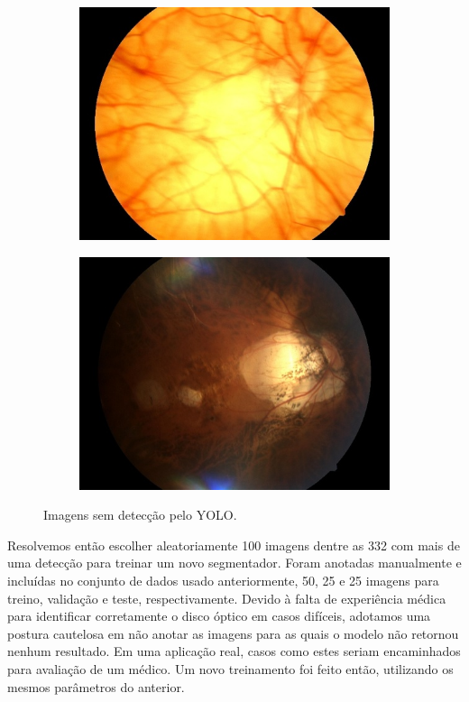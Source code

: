 \documentclass[12pt]{article}
\begin{document}
\begin{figure}
\begin{subfigure}[b]{0.47\textwidth}
        \includegraphics[width=\textwidth]{images/no_box/TRAIN046833_boxes.jpg}
        \label{fig:images_no_box_3}
    \end{subfigure}
    \hfill
    \begin{subfigure}[b]{0.47\textwidth}
        \centering
        \includegraphics[width=\textwidth]{images/no_box/TRAIN099284_boxes.jpg}
        \label{fig:images_no_box_4}
    \end{subfigure}
    \caption{Imagens sem detecção pelo YOLO.}
    \label{fig:images_no_box}
\end{figure}

Resolvemos então escolher aleatoriamente 100 imagens dentre as 332 com mais de uma detecção para treinar um novo segmentador. Foram anotadas manualmente e incluídas no conjunto de dados usado anteriormente, 50, 25 e 25 imagens para treino, validação e teste, respectivamente. Devido à falta de experiência médica para identificar corretamente o disco óptico  em casos difíceis, adotamos uma postura cautelosa em não anotar as imagens para as quais o modelo não retornou nenhum resultado. Em uma aplicação real, casos como estes seriam encaminhados para avaliação de um médico. Um novo treinamento foi feito então, utilizando os mesmos parâmetros do anterior.
\end{document}
